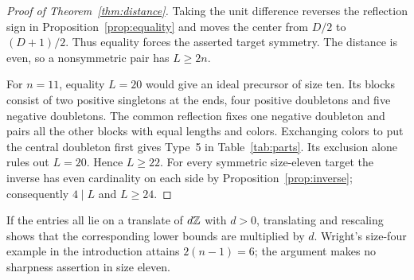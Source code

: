\begin{proof}[Proof of Theorem~\ref{thm:distance}]
Taking the unit difference reverses the reflection sign in Proposition~\ref{prop:equality} and moves the center from \(D/2\) to \((D+1)/2\). Thus equality forces the asserted target symmetry. The distance is even, so a nonsymmetric pair has \(L\ge2n\).

For \(n=11\), equality \(L=20\) would give an ideal precursor of size ten. Its blocks consist of two positive singletons at the ends, four positive doubletons and five negative doubletons. The common reflection fixes one negative doubleton and pairs all the other blocks with equal lengths and colors. Exchanging colors to put the central doubleton first gives Type~5 in Table~\ref{tab:parts}. Its exclusion alone rules out \(L=20\). Hence \(L\ge22\). For every symmetric size-eleven target the inverse has even cardinality on each side by Proposition~\ref{prop:inverse}; consequently \(4\mid L\) and \(L\ge24\).
\end{proof}
If the entries all lie on a translate of \(d\mathbb Z\) with \(d>0\), translating and rescaling shows that the corresponding lower bounds are multiplied by \(d\). Wright's size-four example in the introduction attains \(2(n-1)=6\); the argument makes no sharpness assertion in size eleven.
